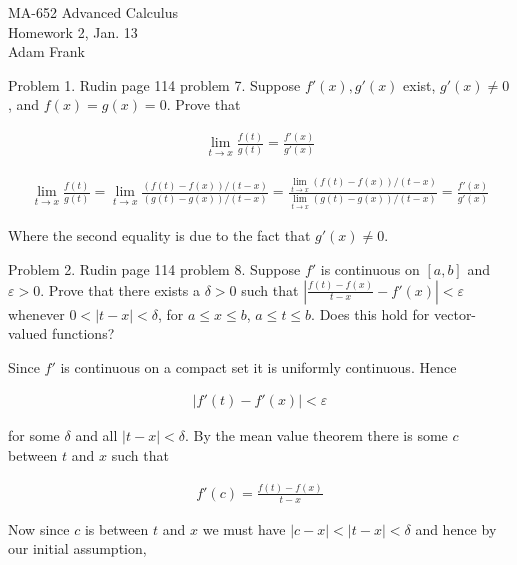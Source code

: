 \documentclass{article}
\begin{document}
  \begin{center} \Large
    MA-652 Advanced Calculus\\
    Homework 2, Jan. 13 \\
    Adam Frank
  \end{center}

  \vspace{1cm}

  {\Large \color{Sepia} Problem 1. Rudin page 114 problem 7. Suppose $f'(x),g'(x)$ exist, $g'(x)\ne 0$, and $f(x)=g(x)=0$.  Prove that

  \begin{align*}
    \lim_{t\to x}\frac{f(t)}{g(t)} = \frac{f'(x)}{g'(x)}
  \end{align*} }

  \vspace{1cm}

  \begin{align*}
    \lim_{t\to x}\frac{f(t)}{g(t)} = \lim_{t\to x}\frac{(f(t)-f(x))/(t-x)}{(g(t)-g(x))/(t-x)} = \frac{\lim_{t\to x}(f(t)-f(x))/(t-x)}{\lim_{t\to x}(g(t)-g(x))/(t-x)} = \frac{f'(x)}{g'(x)}
  \end{align*}

  Where the second equality is due to the fact that $g'(x)\ne 0$.

  \pagebreak

  {\Large \color{Sepia} Problem 2. Rudin page 114 problem 8. Suppose $f'$ is continuous on $[a,b]$ and $\varepsilon>0$.  Prove that there exists a $\delta>0$ such that $\left|\frac{f(t)-f(x)}{t-x}-f'(x)\right|<\varepsilon$ whenever $0<|t-x|<\delta$, for $a\leq x\leq b$, $a\leq t\leq b$.  Does this hold for vector-valued functions?}

  \vspace{1cm}

  Since $f'$ is continuous on a compact set it is uniformly continuous.  Hence

  \begin{align*}
    |f'(t)-f'(x)|<\varepsilon
  \end{align*}

  for some $\delta$ and all $|t-x|<\delta$.  By the mean value theorem there is some $c$ between $t$ and $x$ such that

  \begin{align*}
    f'(c) = \frac{f(t)-f(x)}{t-x}
  \end{align*}

  Now since $c$ is between $t$ and $x$ we must have $|c-x|<|t-x|<\delta$ and hence by our initial assumption,
\end{document}
